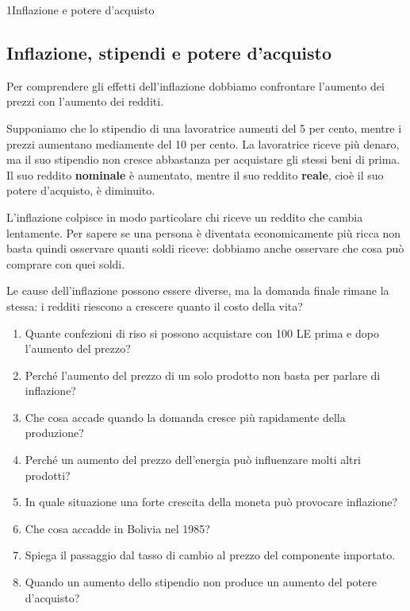 \begin{lettura}{1}{Inflazione e potere d’acquisto}
\subsection*{Inflazione, stipendi e potere d'acquisto}
Per comprendere gli effetti dell'inflazione dobbiamo confrontare l'aumento dei prezzi con l'aumento dei redditi.

Supponiamo che lo stipendio di una lavoratrice aumenti del 5 per cento, mentre i prezzi aumentano mediamente del 10 per cento. La lavoratrice riceve più denaro, ma il suo stipendio non cresce abbastanza per acquistare gli stessi beni di prima. Il suo reddito \textbf{nominale} è aumentato, mentre il suo reddito \textbf{reale}, cioè il suo potere d'acquisto, è diminuito.

L'inflazione colpisce in modo particolare chi riceve un reddito che cambia lentamente. Per sapere se una persona è diventata economicamente più ricca non basta quindi osservare quanti soldi riceve: dobbiamo anche osservare che cosa può comprare con quei soldi.

Le cause dell'inflazione possono essere diverse, ma la domanda finale rimane la stessa: i redditi riescono a crescere quanto il costo della vita?

\attivita
\begin{enumerate}
\item Quante confezioni di riso si possono acquistare con 100 LE prima e dopo l'aumento del prezzo?
\item Perché l'aumento del prezzo di un solo prodotto non basta per parlare di inflazione?
\item Che cosa accade quando la domanda cresce più rapidamente della produzione?
\item Perché un aumento del prezzo dell'energia può influenzare molti altri prodotti?
\item In quale situazione una forte crescita della moneta può provocare inflazione?
\item Che cosa accadde in Bolivia nel 1985?
\item Spiega il passaggio dal tasso di cambio al prezzo del componente importato.
\item Quando un aumento dello stipendio non produce un aumento del potere d'acquisto?
\end{enumerate}

\lessico
{}


\end{lettura}
